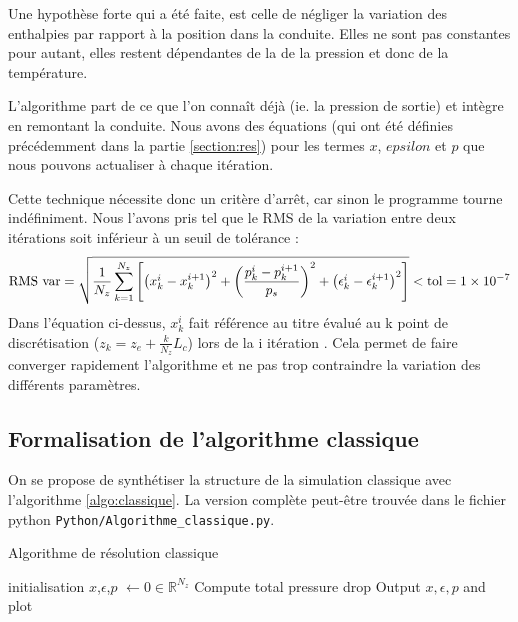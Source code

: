 Une hypothèse forte qui a été faite, est celle de négliger la variation des enthalpies par rapport à la position dans la conduite. Elles ne sont pas constantes pour autant, elles restent dépendantes de la de la pression et donc de la température.\\ \par
L'algorithme part de ce que l'on connaît déjà (ie. la pression de sortie) et intègre en \og remontant \fg{} la conduite. Nous avons des équations (qui ont été définies précédemment dans la partie \ref{section:res}) pour les termes $x$, $epsilon$ et $p$ que nous pouvons actualiser à chaque itération.\\ \par
Cette technique nécessite donc un critère d'arrêt, car sinon le programme tourne indéfiniment. Nous l'avons pris tel que le RMS de la variation entre deux itérations soit inférieur à un seuil de tolérance :
\begin{equation}
    \textnormal{RMS var} = \sqrt{\frac{1}{N_z}\sum_{k=1}^{N_z}\left[\left(x^{i}_k-x^{i+1}_k\right)^2 + \left(\frac{p^i_k- p^{i+1}_k}{p_s} \right)^2 + \left(\epsilon^i_k - \epsilon^{i+1}_k \right)^2\right]} <  \textnormal{tol} =\num{1e-7}
\end{equation}
Dans l'équation ci-dessus, $x^i_k$ fait référence au titre évalué au k point de discrétisation ($z_k = z_e + \frac{k}{N_z}L_c$) lors de la i itération . Cela permet de faire converger rapidement l'algorithme et ne pas trop contraindre la variation des différents paramètres.


\subsection{Formalisation de l'algorithme classique}

On se propose de synthétiser la structure de la simulation classique avec l'algorithme \ref{algo:classique}. La version complète peut-être trouvée dans le fichier python \verb|Python/Algorithme_classique.py|.

\begin{algorithm}
\label{algo:classique}
\caption{Algorithme de résolution classique}
\SetAlgoLined
{}
initialisation\;
$x$,$\epsilon$,$p$ $\leftarrow 0 \in \mathbb{R}^{N_z}$ \;
Compute total pressure drop\;
Output $x,\epsilon,p$ and plot\;
\end{algorithm}



